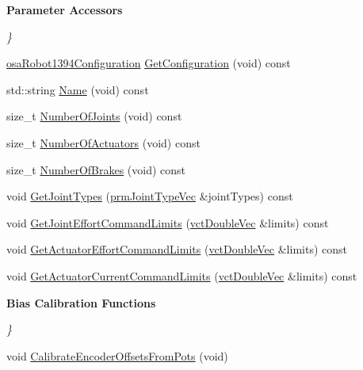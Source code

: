 \begin{Indent}{\bf Parameter Accessors}\par
{\em \} }\begin{DoxyCompactItemize}
\item 
\hyperlink{structsaw_robot_i_o1394_1_1osa_robot1394_configuration}{osa\+Robot1394\+Configuration} \hyperlink{classsaw_robot_i_o1394_1_1osa_robot1394_adf520906bf5d183fe3df07f0f3e02023}{Get\+Configuration} (void) const 
\item 
std\+::string \hyperlink{classsaw_robot_i_o1394_1_1osa_robot1394_aec7dc72444d443fa19cc2548e7075ac4}{Name} (void) const 
\item 
size\+\_\+t \hyperlink{classsaw_robot_i_o1394_1_1osa_robot1394_a382c3409976e75099e8e88ed14eb95d7}{Number\+Of\+Joints} (void) const 
\item 
size\+\_\+t \hyperlink{classsaw_robot_i_o1394_1_1osa_robot1394_af99d3703d915a397b34633f5a5a4968d}{Number\+Of\+Actuators} (void) const 
\item 
size\+\_\+t \hyperlink{classsaw_robot_i_o1394_1_1osa_robot1394_a05a9efe49036caedb16bc435e96ad705}{Number\+Of\+Brakes} (void) const 
\item 
void \hyperlink{classsaw_robot_i_o1394_1_1osa_robot1394_a1caed838046de3d1e1c25dd7f3dbe690}{Get\+Joint\+Types} (\hyperlink{prm_joint_type_8h_a3a21392b4484e2e24aa0b73d553f940e}{prm\+Joint\+Type\+Vec} \&joint\+Types) const 
\item 
void \hyperlink{classsaw_robot_i_o1394_1_1osa_robot1394_a825ced0f4c3ac85fb55a57abeef33c8a}{Get\+Joint\+Effort\+Command\+Limits} (\hyperlink{vct_dynamic_vector_types_8h_ade4b3068c86fb88f41af2e5187e491c2}{vct\+Double\+Vec} \&limits) const 
\item 
void \hyperlink{classsaw_robot_i_o1394_1_1osa_robot1394_aac0cb2dcb0a11d0d4ee376944f8b03ab}{Get\+Actuator\+Effort\+Command\+Limits} (\hyperlink{vct_dynamic_vector_types_8h_ade4b3068c86fb88f41af2e5187e491c2}{vct\+Double\+Vec} \&limits) const 
\item 
void \hyperlink{classsaw_robot_i_o1394_1_1osa_robot1394_ab29e269479f2dd3d9e64a48d6e944107}{Get\+Actuator\+Current\+Command\+Limits} (\hyperlink{vct_dynamic_vector_types_8h_ade4b3068c86fb88f41af2e5187e491c2}{vct\+Double\+Vec} \&limits) const 
\end{DoxyCompactItemize}
\end{Indent}
\begin{Indent}{\bf Bias Calibration Functions}\par
{\em \} }\begin{DoxyCompactItemize}
\item 
void \hyperlink{classsaw_robot_i_o1394_1_1osa_robot1394_a44c554bb95c4c56aa936dc586e3cc888}{Calibrate\+Encoder\+Offsets\+From\+Pots} (void)
\end{DoxyCompactItemize}
\end{Indent}
